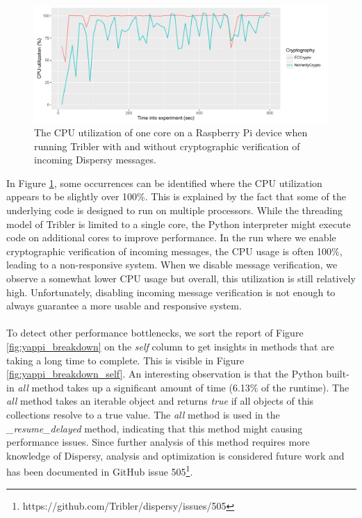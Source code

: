 \begin{figure}[!h]
	\centering
	\includegraphics[width=1.0\columnwidth]{images/experiments/raspi_cpu_usage}
	\caption{The CPU utilization of one core on a Raspberry Pi device when running Tribler with and without cryptographic verification of incoming Dispersy messages.}
	\label{fig:raspi_cpu_usage}
\end{figure}

\noindent In Figure \ref{fig:raspi_cpu_usage}, some occurrences can be identified where the CPU utilization appears to be slightly over 100\%. This is explained by the fact that some of the underlying code is designed to run on multiple processors. While the threading model of Tribler is limited to a single core, the Python interpreter might execute code on additional cores to improve performance. In the run where we enable cryptographic verification of incoming messages, the CPU usage is often 100\%, leading to a non-responsive system. When we disable message verification, we observe a somewhat lower CPU usage but overall, this utilization is still relatively high. Unfortunately, disabling incoming message verification is not enough to always guarantee a more usable and responsive system.\\\\
To detect other performance bottlenecks, we sort the report of Figure \ref{fig:yappi_breakdown} on the \emph{self} column to get insights in methods that are taking a long time to complete. This is visible in Figure \ref{fig:yappi_breakdown_self}. An interesting observation is that the Python built-in \emph{all} method takes up a significant amount of time (6.13\% of the runtime). The \emph{all} method takes an iterable object and returns \emph{true} if all objects of this collections resolve to a true value. The \emph{all} method is used in the \emph{\_resume\_delayed} method, indicating that this method might causing performance issues. Since further analysis of this method requires more knowledge of Dispersy, analysis and optimization is considered future work and has been documented in GitHub issue 505\footnote{https://github.com/Tribler/dispersy/issues/505}.\\

